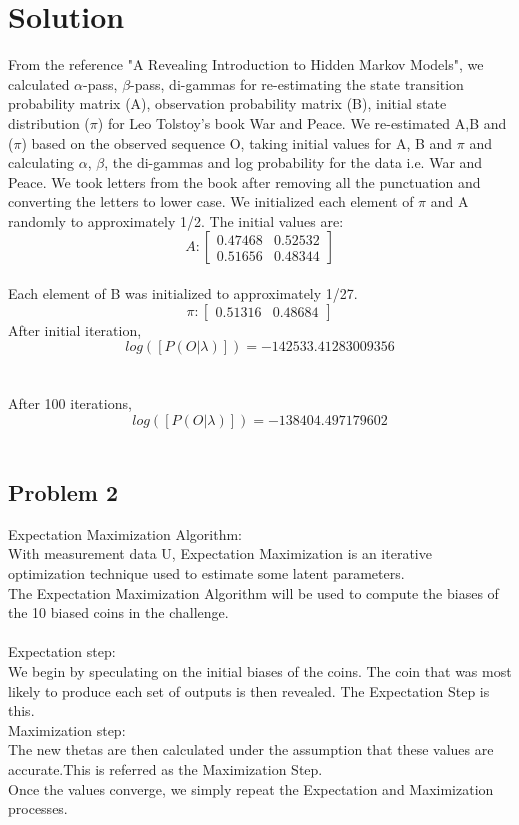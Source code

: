 \documentclass[letterpaper, 12 pt, conference]{IEEEtran}
\begin{document}
\section{Solution}
\indent From the reference "A Revealing Introduction to Hidden Markov Models", we calculated $\alpha$-pass, $\beta$-pass, di-gammas for re-estimating the state transition probability matrix (A), observation probability matrix (B), initial state distribution ($\pi$) for Leo Tolstoy’s book War and Peace. We re-estimated A,B and ($\pi$) based on the observed sequence O, taking initial values for A, B and $\pi$ and calculating $\alpha$, $\beta$, the di-gammas and log probability for the data i.e. War and Peace. We took letters from the book after removing all the punctuation and converting the letters to lower case. We initialized each element of $\pi$ and A randomly to approximately 1/2. The initial values are:\\
\[A:\begin{bmatrix}
0.47468 & 0.52532\\
0.51656 & 0.48344
\end{bmatrix}\] \\
Each element of B was initialized to approximately 1/27.\\
\[\pi:\begin{bmatrix}
0.51316 & 0.48684
\end{bmatrix}\]
After initial iteration,\\
\[log([P(O|\lambda)]) = -142533.41283009356\]\\ \\
After 100 iterations,\\
\[log([P(O|\lambda)]) = -138404.497179602\]\\
\subsection{Problem 2}
\noindent Expectation Maximization Algorithm:\\
With measurement data U, Expectation Maximization is an iterative optimization technique used to estimate some latent parameters.\\
\indent The Expectation Maximization Algorithm will be used to compute the biases of the 10 biased coins in the challenge.\\ \\
Expectation step:\\
We begin by speculating on the initial biases of the coins. The coin that was most likely to produce each set of outputs is then revealed. The Expectation Step is this.\\
Maximization step:\\
The new thetas are then calculated under the assumption that these values are accurate.This is referred as the Maximization Step.\\
Once the values converge, we simply repeat the Expectation and Maximization processes.
\end{document}

